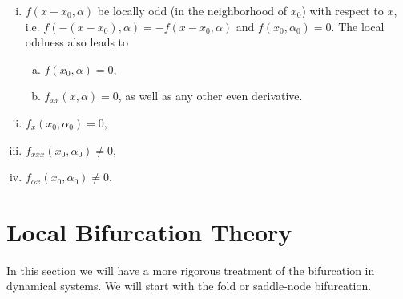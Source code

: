 \begin{enumerate}[(i)]
	\item $f(x-x_0,\alpha)$ be locally odd (in the neighborhood of $x_0$) with respect to $x$, i.e. $f(-(x-x_0),\alpha) = - f(x-x_0,\alpha)$ and $f(x_0,\alpha_0) =0 $. The local oddness also leads to 
	\begin{enumerate}[(a)]
		\item $f(x_0,\alpha) = 0$,
		\item $f_{xx}(x,\alpha)=0$, as well as any other even derivative.
	\end{enumerate} 
	\item $f_x(x_0,\alpha_0) =0$,
	\item $f_{xxx}(x_0,\alpha_0) \neq 0$,
	\item $f_{\alpha x} (x_0,\alpha_0) \neq 0$.
\end{enumerate}


\section{Local Bifurcation Theory}
In this section we will have a more rigorous treatment of the bifurcation in dynamical systems. We will start with the fold or saddle-node bifurcation.